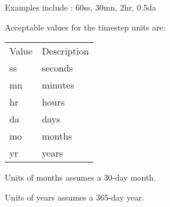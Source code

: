  Examples include : 60ss, 30mn, 2hr, 0.5da

 Acceptable values for the timestep units are: 

 \begin{tabular}{ll}
 Value & Description \\
 ss    & seconds     \\
 mn    & minutes     \\
 hr    & hours       \\
 da    & days        \\
 mo    & months      \\
 yr    & years       \\
 \end{tabular}

 Units of months assumes a 30-day month.

 Units of years assumes a 365-day year.
 

